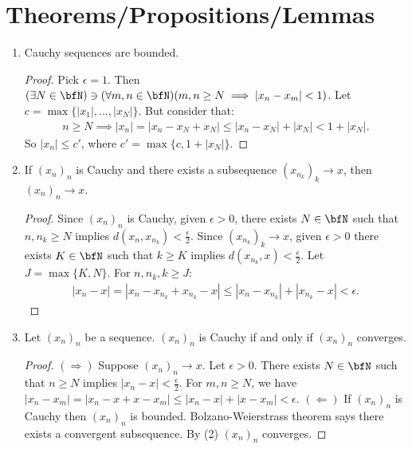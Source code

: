 \section*{Theorems/Propositions/Lemmas}
    \begin{enumerate}[label = (\arabic*)]
        \item Cauchy sequences are bounded.
            {\color{red} \begin{proof}
                Pick $\epsilon = 1$. Then $(\exists N \in \bfN) \ni (\forall m,n \in \bfN)(m,n \geq N \implies |x_n - x_m| < 1)$. Let $c = \max\{|x_1|,...,|x_N| \}$. But consider that:
                    \begin{equation*}
                    \begin{split}
                        n \geq N \implies |x_n| = |x_n - x_N + x_N| \leq |x_n - x_N| + |x_N| < 1 + |x_N|.
                    \end{split}
                    \end{equation*}
                So $|x_n| \leq c'$, where $c' = \max\{c,1 + |x_N|\}$.
            \end{proof}}

        \item If $(x_n)_n$ is Cauchy and there exists a subsequence $(x_{n_k})_k \rightarrow x$, then $(x_n)_n \rightarrow x$.
            {\color{red} \begin{proof}
                Since $(x_n)_n$ is Cauchy, given $\epsilon > 0$, there exists $N \in \bfN$ such that $n,n_k \geq N$ implies $d(x_n,x_{n_k}) < \frac{\epsilon}{2}$. Since $(x_{n_k})_k \rightarrow x$, given $\epsilon > 0$ there exists $K \in \bfN$ such that $k \geq K$ implies $d(x_{n_k},x) < \frac{\epsilon}{2}$. Let $J = \max\{K,N\}$. For $n,n_k,k \geq J$:
                    \begin{equation*}
                    \begin{split}
                        |x_n - x| = |x_n - x_{n_k} + x_{n_k} - x| \leq |x_n - x_{n_k}| + |x_{n_k} - x| < \epsilon.
                    \end{split}
                    \end{equation*}
            \end{proof}}

        \item Let $(x_n)_n$ be a sequence. $(x_n)_n$ is Cauchy if and only if $(x_n)_n$ converges.
            {\color{red} \begin{proof}
                $(\Rightarrow)$ Suppose $(x_n)_n \rightarrow x$. Let $\epsilon > 0$. There exists $N \in \bfN$ such that $n \geq N$ implies $|x_n -x | < \frac{\epsilon}{2}$. For $m,n \geq N$, we have $|x_n - x_m| = |x_n - x + x - x_m| \leq |x_n - x| + |x - x_m| < \epsilon$. $(\Leftarrow)$ If $(x_n)_n$ is Cauchy then $(x_n)_n$ is bounded. Bolzano-Weierstrass theorem says there exists a convergent subsequence. By (2) $(x_n)_n$ converges.
            \end{proof}}


\end{enumerate}
